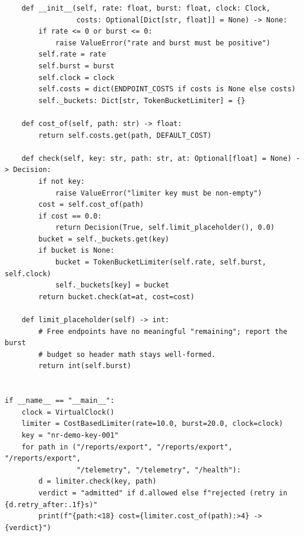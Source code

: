 \begin{verbatim}
    def __init__(self, rate: float, burst: float, clock: Clock,
                 costs: Optional[Dict[str, float]] = None) -> None:
        if rate <= 0 or burst <= 0:
            raise ValueError("rate and burst must be positive")
        self.rate = rate
        self.burst = burst
        self.clock = clock
        self.costs = dict(ENDPOINT_COSTS if costs is None else costs)
        self._buckets: Dict[str, TokenBucketLimiter] = {}

    def cost_of(self, path: str) -> float:
        return self.costs.get(path, DEFAULT_COST)

    def check(self, key: str, path: str, at: Optional[float] = None) -> Decision:
        if not key:
            raise ValueError("limiter key must be non-empty")
        cost = self.cost_of(path)
        if cost == 0.0:
            return Decision(True, self.limit_placeholder(), 0.0)
        bucket = self._buckets.get(key)
        if bucket is None:
            bucket = TokenBucketLimiter(self.rate, self.burst, self.clock)
            self._buckets[key] = bucket
        return bucket.check(at=at, cost=cost)

    def limit_placeholder(self) -> int:
        # Free endpoints have no meaningful "remaining"; report the burst
        # budget so header math stays well-formed.
        return int(self.burst)


if __name__ == "__main__":
    clock = VirtualClock()
    limiter = CostBasedLimiter(rate=10.0, burst=20.0, clock=clock)
    key = "nr-demo-key-001"
    for path in ("/reports/export", "/reports/export", "/reports/export",
                 "/telemetry", "/telemetry", "/health"):
        d = limiter.check(key, path)
        verdict = "admitted" if d.allowed else f"rejected (retry in {d.retry_after:.1f}s)"
        print(f"{path:<18} cost={limiter.cost_of(path):>4} -> {verdict}")
\end{verbatim}

